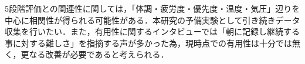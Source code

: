 5段階評価との関連性に関しては，「体調・疲労度・優先度・温度・気圧」辺りを中心に相関性が得られる可能性がある．本研究の予備実験として引き続きデータ収集を行いたい．また，有用性に関するインタビューでは「朝に記録し継続する事に対する難しさ」を指摘する声が多かった為，現時点での有用性は十分では無く，更なる改善が必要であると考えられる．